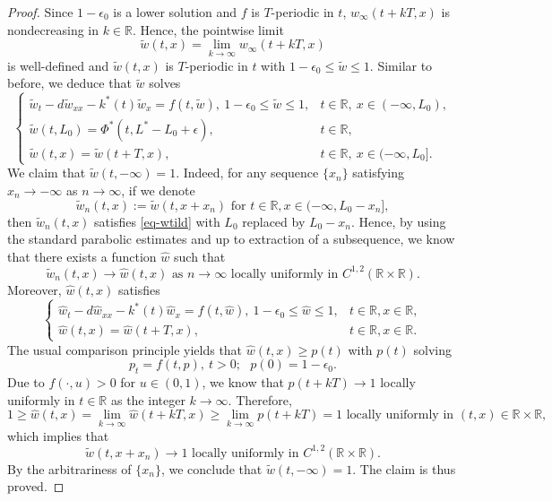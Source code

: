 \documentclass[11pt]{amsart}
\numberwithin{equation}{section}
\begin{document}
\begin{proof}
Since $1-\epsilon_0$ is a  lower solution and $f$  is $T$-periodic in $t$,  $w_\infty(t+kT,x)$ is nondecreasing  in $k\in\mathbb R$. Hence, the pointwise limit
\begin{equation*}
  \tilde{w}(t,x)=\lim_{k\to\infty}w_\infty(t+kT,x)
\end{equation*}
is well-defined and $\tilde{w}(t,x)$ is $T$-periodic  in $t$ with $1-\epsilon_0\leq \tilde{w}\leq 1$.   Similar to before,  we deduce that  $\tilde{w}$ solves
\begin{equation}\label{eq-wtild}
  \begin{cases}
    \tilde{w}_t-d\tilde{w}_{xx}-k^*(t)\tilde{w}_x=f(t,\tilde{w}), ~1-\epsilon_0\leq \tilde{w}\leq 1, &t\in\mathbb R,\  x\in(-\infty,L_0),\\
    \tilde{w}(t,L_0)=\Phi^*(t,L^*-L_0+\epsilon), &t\in\mathbb R,\\
    \tilde{w}(t,x)=\tilde{w}(t+T,x), &t\in\mathbb R,\  x\in(-\infty,L_0].
  \end{cases}
\end{equation}
We claim that $\tilde{w}(t,-\infty)=1$. Indeed, for any sequence $\{x_n\}$  satisfying $x_n\to-\infty$ as $n\to\infty$, if we  denote 
\[\tilde{w}_n(t,x):=\tilde{w}(t,x+x_n) \text{ for } t\in\mathbb{R}, x\in(-\infty, L_0-x_n],\]
then $\tilde{w}_n(t,x)$ satisfies \eqref{eq-wtild} with $L_0$ replaced by $L_0-x_n$. Hence, by using the standard parabolic estimates and up to extraction of a subsequence, we know that there exists a function $\hat{w}$ such that 
\[\tilde{w}_n(t,x)\to\hat{w}(t,x) \text{  as } n\to\infty \text{ locally uniformly in } C^{1, 2}(\mathbb{R}\times\mathbb{R}).\]
Moreover, $\hat{w}(t,x)$ satisfies 
\[ \begin{cases}
  \hat{w}_t-d\hat{w}_{xx}-k^*(t)\hat{w}_x=f(t,\hat{w}), ~1-\epsilon_0\leq \hat{w}\leq 1, &t\in\mathbb R, x\in\mathbb{R},\\
  \hat{w}(t,x)=\hat{w}(t+T,x), &t\in\mathbb R, x\in\mathbb{R}.
\end{cases}
\]
The usual comparison principle yields that $\hat{w}(t,x)\geq p(t)$ with $p(t)$ solving
\[p_t=f(t,p),~t>0;~~~p(0)=1-\epsilon_0.\]
Due to $f(\cdot,u)>0$ for $u\in(0,1)$, we know that $p(t+kT)\to 1$  locally uniformly in $t\in\mathbb{R}$ as the integer $ k\to\infty$. Therefore, 
\[1\geq \hat{w}(t,x)=\lim_{k\to\infty}\hat{w}(t+kT,x)\geq \lim_{k\to\infty}p(t+kT)=1  \text{ locally uniformly in }(t,x)\in\mathbb{R}\times\mathbb R,\]
which implies that 
\[\tilde{w}(t,x+x_n)\to 1   \text{ locally uniformly in } C^{1, 2}(\mathbb{R}\times\mathbb{R}).\]
By the arbitrariness of  $\{x_n\}$, we conclude that $\tilde{w}(t,-\infty)=1$. The claim is thus proved.



\end{proof}
\end{document}
